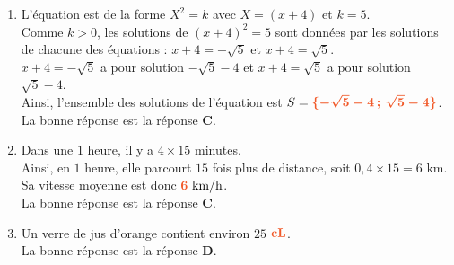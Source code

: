 \documentclass[a4paper,11pt]{article}
\begin{document}
{\begin{seanceD}{}
\begin{enumerate}
\medskip
La bonne réponse est la réponse {\bfseries \color[HTML]{F15929}B}.

\item L'équation est de la forme $X^2=k$ avec $X=(x+4)$ et $k=5$.\\
        Comme $k>0$, les solutions de $(x+4)^2=5$ sont données par les solutions de chacune des équations :         $x+4=-\sqrt{5}$ et $x+4=\sqrt{5}$.\\
        $x+4=-\sqrt{5}$ a pour solution $-\sqrt{5}-4$ et 
        $x+4=\sqrt{5}$ a pour solution $\sqrt{5}-4$.\\
        Ainsi, l'ensemble des solutions de l'équation est $S={\color[HTML]{F15929}\boldsymbol{\{-\sqrt{5}-4\,;\,\sqrt{5}-4\}}}$.
         \\La bonne réponse est la réponse {\bfseries \color[HTML]{F15929}C}.

\item Dans une $1$ heure, il y a $4\times 15$ minutes.\\
    Ainsi, en $1$ heure, elle parcourt $15$ fois plus de distance, soit $0{,}4\times 15=6\text{ km}$.\\
    Sa vitesse moyenne est donc ${\color[HTML]{F15929}\boldsymbol{6}}\text{ km/h}$. \\La bonne réponse est la réponse {\bfseries \color[HTML]{F15929}C}.

\item Un verre de jus d'orange contient environ $25$ ${\color[HTML]{F15929}\boldsymbol{\textbf{cL}}}$.\\La bonne réponse est la réponse {\bfseries \color[HTML]{F15929}D}.

\end{enumerate}

\end{seanceD}
}{}
\end{document}
